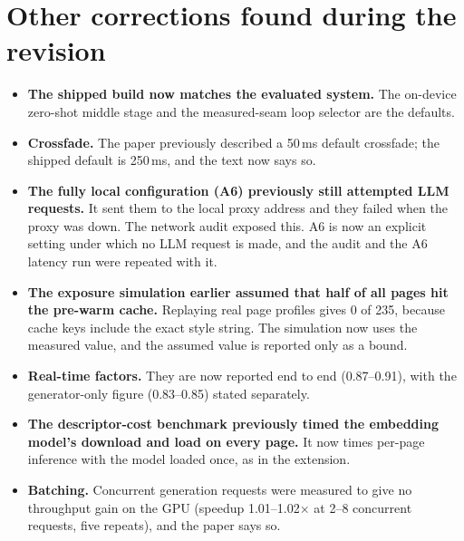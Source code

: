 \documentclass[10pt]{article}
\begin{document}
\section*{Other corrections found during the revision}
\begin{itemize}
\item \textbf{The shipped build now matches the evaluated system.} The on-device zero-shot
  middle stage and the measured-seam loop selector are the defaults.
\item \textbf{Crossfade.} The paper previously described a 50\,ms default crossfade; the
  shipped default is 250\,ms, and the text now says so.
\item \textbf{The fully local configuration (A6) previously still attempted LLM requests.} It
  sent them to the local proxy address and they failed when the proxy was down. The network
  audit exposed this. A6 is now an explicit setting under which no LLM request is made, and
  the audit and the A6 latency run were repeated with it.
\item \textbf{The exposure simulation earlier assumed that half of all pages hit the pre-warm
  cache.} Replaying real page profiles gives 0 of 235, because cache keys include the exact
  style string. The simulation now uses the measured value, and the assumed value is reported
  only as a bound.
\item \textbf{Real-time factors.} They are now reported end to end (0.87--0.91), with the
  generator-only figure (0.83--0.85) stated separately.
\item \textbf{The descriptor-cost benchmark previously timed the embedding model's download
  and load on every page.} It now times per-page inference with the model loaded once, as in
  the extension.
\item \textbf{Batching.} Concurrent generation requests were measured to give no throughput
  gain on the GPU (speedup 1.01--1.02$\times$ at 2--8 concurrent requests, five repeats), and
  the paper says so.
\end{itemize}
\end{document}
